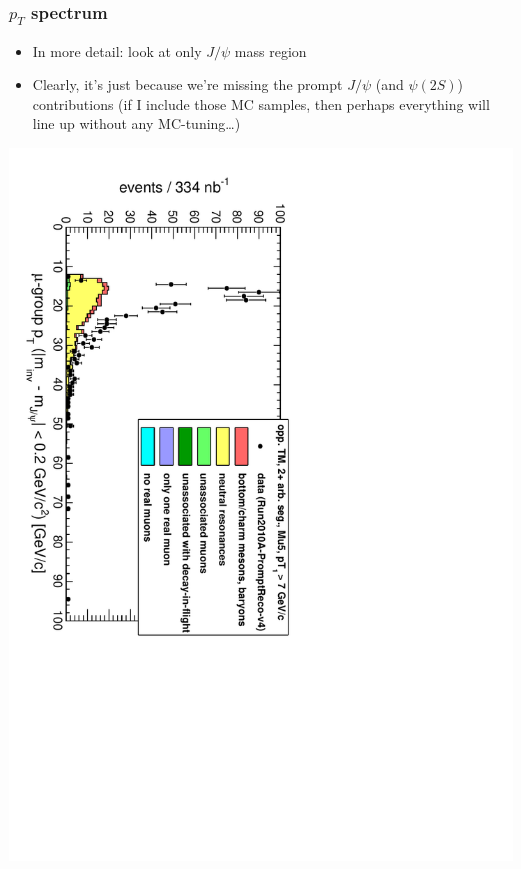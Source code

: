 \documentclass[compress]{beamer}
\begin{document}
\begin{frame}
\frametitle{$p_T$ spectrum}
\begin{itemize}
\item In more detail: look at only $J/\psi$ mass region
\item Clearly, it's just because we're missing the prompt $J/\psi$
(and $\psi(2S)$) contributions {\scriptsize (if I include those MC
samples, then perhaps everything will line up without any
MC-tuning\ldots)}
\end{itemize}

\vfill
\includegraphics[height=\linewidth, angle=90]{Mu5_pt_jpsi.pdf}
\end{frame}
\end{document}
